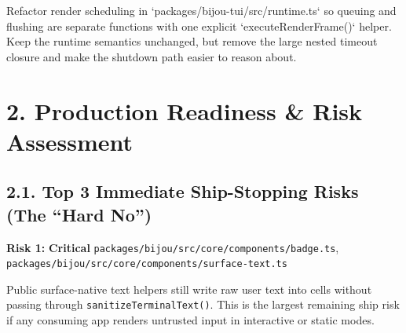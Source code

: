 \begin{CodeBlock}
Refactor render scheduling in `packages/bijou-tui/src/runtime.ts` so queuing and flushing are separate functions with one explicit `executeRenderFrame()` helper. Keep the runtime semantics unchanged, but remove the large nested timeout closure and make the shutdown path easier to reason about.
\end{CodeBlock}

\section{2. Production Readiness \& Risk Assessment}\label{record-418-production-readiness-risk-assessment}

\subsection{2.1. Top 3 Immediate Ship-Stopping Risks (The ``Hard No'')}\label{record-418-top-3-immediate-ship-stopping-risks-the-hard-no}

\textbf{Risk 1:} \textbf{Critical} \textbar{} \texttt{p\allowbreak{}a\allowbreak{}c\allowbreak{}k\allowbreak{}a\allowbreak{}g\allowbreak{}e\allowbreak{}s\allowbreak{}/\allowbreak{}b\allowbreak{}i\allowbreak{}j\allowbreak{}o\allowbreak{}u\allowbreak{}/\allowbreak{}s\allowbreak{}r\allowbreak{}c\allowbreak{}/\allowbreak{}c\allowbreak{}o\allowbreak{}r\allowbreak{}e\allowbreak{}/\allowbreak{}c\allowbreak{}o\allowbreak{}m\allowbreak{}p\allowbreak{}o\allowbreak{}n\allowbreak{}e\allowbreak{}n\allowbreak{}t\allowbreak{}s\allowbreak{}/\allowbreak{}b\allowbreak{}a\allowbreak{}d\allowbreak{}g\allowbreak{}e\allowbreak{}.\allowbreak{}t\allowbreak{}s}, \texttt{p\allowbreak{}a\allowbreak{}c\allowbreak{}k\allowbreak{}a\allowbreak{}g\allowbreak{}e\allowbreak{}s\allowbreak{}/\allowbreak{}b\allowbreak{}i\allowbreak{}j\allowbreak{}o\allowbreak{}u\allowbreak{}/\allowbreak{}s\allowbreak{}r\allowbreak{}c\allowbreak{}/\allowbreak{}c\allowbreak{}o\allowbreak{}r\allowbreak{}e\allowbreak{}/\allowbreak{}c\allowbreak{}o\allowbreak{}m\allowbreak{}p\allowbreak{}o\allowbreak{}n\allowbreak{}e\allowbreak{}n\allowbreak{}t\allowbreak{}s\allowbreak{}/\allowbreak{}s\allowbreak{}u\allowbreak{}r\allowbreak{}f\allowbreak{}a\allowbreak{}c\allowbreak{}e\allowbreak{}-\allowbreak{}t\allowbreak{}e\allowbreak{}x\allowbreak{}t\allowbreak{}.\allowbreak{}t\allowbreak{}s}

Public surface-native text helpers still write raw user text into cells without passing through \texttt{s\allowbreak{}a\allowbreak{}n\allowbreak{}i\allowbreak{}t\allowbreak{}i\allowbreak{}z\allowbreak{}e\allowbreak{}T\allowbreak{}e\allowbreak{}r\allowbreak{}m\allowbreak{}i\allowbreak{}n\allowbreak{}a\allowbreak{}l\allowbreak{}T\allowbreak{}e\allowbreak{}x\allowbreak{}t\allowbreak{}(\allowbreak{})}. This is the largest remaining ship risk if any consuming app renders untrusted input in interactive or static modes.

